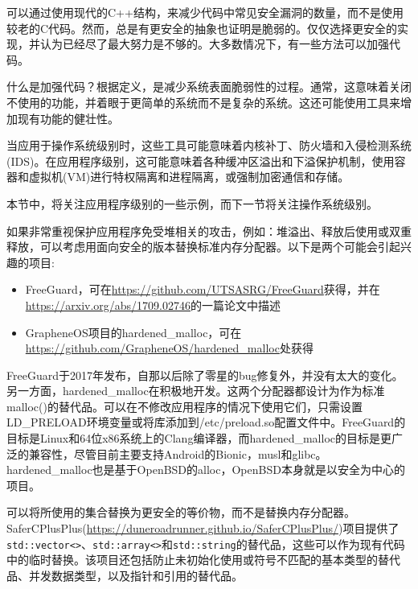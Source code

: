 可以通过使用现代的C++结构，来减少代码中常见安全漏洞的数量，而不是使用较老的C代码。然而，总是有更安全的抽象也证明是脆弱的。仅仅选择更安全的实现，并认为已经尽了最大努力是不够的。大多数情况下，有一些方法可以加强代码。

什么是加强代码？根据定义，是减少系统表面脆弱性的过程。通常，这意味着关闭不使用的功能，并着眼于更简单的系统而不是复杂的系统。这还可能使用工具来增加现有功能的健壮性。

当应用于操作系统级别时，这些工具可能意味着内核补丁、防火墙和入侵检测系统(IDS)。在应用程序级别，这可能意味着各种缓冲区溢出和下溢保护机制，使用容器和虚拟机(VM)进行特权隔离和进程隔离，或强制加密通信和存储。

本节中，将关注应用程序级别的一些示例，而下一节将关注操作系统级别。


如果非常重视保护应用程序免受堆相关的攻击，例如：堆溢出、释放后使用或双重释放，可以考虑用面向安全的版本替换标准内存分配器。以下是两个可能会引起兴趣的项目:

\begin{itemize}
\item 
FreeGuard，可在\url{https://github.com/UTSASRG/FreeGuard}获得，并在\url{https://arxiv.org/abs/1709.02746}的一篇论文中描述

\item 
GrapheneOS项目的hardened\_malloc，可在\url{https://github.com/GrapheneOS/hardened\_malloc}处获得
\end{itemize}

FreeGuard于2017年发布，自那以后除了零星的bug修复外，并没有太大的变化。另一方面，hardened\_malloc在积极地开发。这两个分配器都设计为作为标准malloc()的替代品。可以在不修改应用程序的情况下使用它们，只需设置LD\_PRELOAD环境变量或将库添加到/etc/preload.so配置文件中。FreeGuard的目标是Linux和64位x86系统上的Clang编译器，而hardened\_malloc的目标是更广泛的兼容性，尽管目前主要支持Android的Bionic，musl和glibc。hardened\_malloc也是基于OpenBSD的alloc，OpenBSD本身就是以安全为中心的项目。

可以将所使用的集合替换为更安全的等价物，而不是替换内存分配器。SaferCPlusPlus(\url{https://duneroadrunner.github.io/SaferCPlusPlus/})项目提供了\texttt{std::vector<>}、\texttt{std::array<>}和\texttt{std::string}的替代品，这些可以作为现有代码中的临时替换。该项目还包括防止未初始化使用或符号不匹配的基本类型的替代品、并发数据类型，以及指针和引用的替代品。


